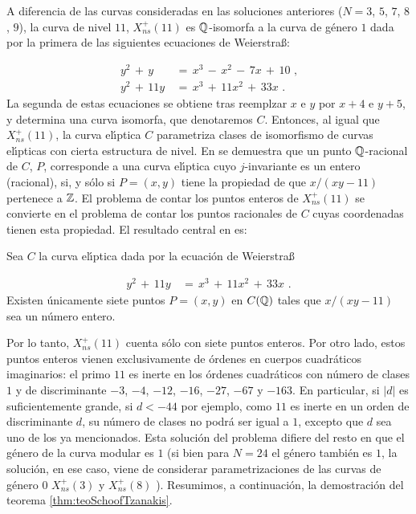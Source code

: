 A diferencia de las curvas consideradas en las soluciones anteriores
($N=3$, $5$, $7$, $8$, $9$), la curva de nivel $11$, $X_{ns}^{+}(11)$
es $\mathbb{Q}$-isomorfa a la curva de g\'{e}nero $1$ dada por la primera
de las siguientes ecuaciones de Weierstra{\ss}:

\begin{align*}
y^{2}\,+\,y & \,=\,x^{3}\,-\,x^{2}\,-\,7x\,+\,10\text{ ,}\\
y^{2}\,+\,11y & \,=\,x^{3}\,+\,11x^{2}\,+\,33x\text{ .}
\end{align*}
La segunda de estas ecuaciones se obtiene tras reemplzar $x$ e $y$ por
$x+4$ e $y+5$, y determina una curva isomorfa, que denotaremos $C$.
Entonces, al igual que $X_{ns}^{+}(11)$, la curva el\'{\i}ptica $C$
parametriza clases de isomorfismo de curvas el\'{\i}pticas con cierta
estructura de nivel. En \cite{schoofTzanakisLevelEleven} se demuestra que un punto
$\mathbb{Q}$-racional de $C$, $P$, corresponde a una curva el\'{\i}ptica
cuyo $j$-invariante es un entero (racional), si, y s\'{o}lo si
$P=(x,y)$ tiene la propiedad de que $x/(xy-11)$ pertenece a $\mathbb{Z}$.
El problema de contar los puntos enteros de $X_{ns}^{+}(11)$ se
convierte en el problema de contar los puntos racionales de $C$ cuyas
coordenadas tienen esta propiedad. El resultado central en
\cite{schoofTzanakisLevelEleven} es:

\begin{teoSchoofTzanakis}\label{thm:teoSchoofTzanakis}
Sea $C$ la curva el\'{\i}ptica dada por la ecuaci\'{o}n de
Weierstra{\ss}

\begin{align*}
y^{2}\,+\,11y & \,=\,x^{3}\,+\,11x^{2}\,+\,33x\text{ .}
\end{align*}
Existen \'{u}nicamente siete puntos $P=(x,y)$ en $C(\mathbb{Q})$ tales que
$x/(xy-11)$ sea un n\'{u}mero entero.
\end{teoSchoofTzanakis}
Por lo tanto, $X_{ns}^{+}(11)$ cuenta s\'{o}lo con siete puntos
enteros. Por otro lado, estos puntos enteros vienen exclusivamente
de \'{o}rdenes en cuerpos cuadr\'{a}ticos imaginarios: el primo $11$ es
inerte en los \'{o}rdenes cuadr\'{a}ticos con n\'{u}mero de clases
$1$ y de discriminante $-3$, $-4$, $-12$, $-16$, $-27$, $-67$ y $-163$.
En particular, si
$|d|$ es suficientemente grande, si $d<-44$ por ejemplo, como $11$ es
inerte en un orden de discriminante $d$, su n\'{u}mero de clases no
podr\'{a} ser igual a $1$, excepto que $d$ sea uno de los ya
mencionados. Esta soluci\'{o}n del problema difiere del resto en que
el g\'{e}nero de la curva modular es $1$ (si bien para $N=24$ el
g\'{e}nero tambi\'{e}n es $1$, la soluci\'{o}n, en ese caso, viene de
considerar parametrizaciones de las curvas de g\'{e}nero $0$
$X_{ns}^{+}(3)$ y $X_{ns}^{+}(8)$ \cite{booher}).
Resumimos, a continuaci\'{o}n, la demostraci\'{o}n del teorema
\ref{thm:teoSchoofTzanakis}.

